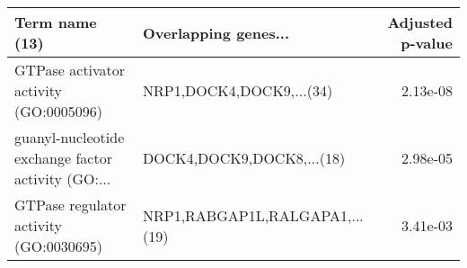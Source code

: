 \begin{tabular}{llr}
\toprule
                                    Term name (13) &           Overlapping genes... &  Adjusted p-value \\
\midrule
            GTPase activator activity (GO:0005096) &       NRP1,DOCK4,DOCK9,...(34) &          2.13e-08 \\
guanyl-nucleotide exchange factor activity (GO:... &      DOCK4,DOCK9,DOCK8,...(18) &          2.98e-05 \\
            GTPase regulator activity (GO:0030695) & NRP1,RABGAP1L,RALGAPA1,...(19) &          3.41e-03 \\
\bottomrule
\end{tabular}
